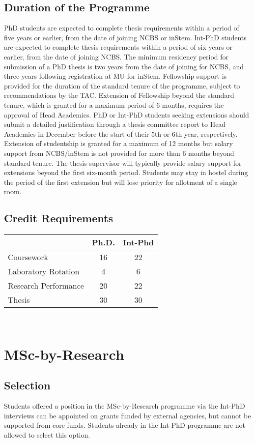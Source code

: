 \documentclass[a4paper]{extarticle}
\begin{document}
\subsection{Duration of the Programme}
PhD students are expected to complete thesis requirements within a period of
five years or earlier, from the date of joining NCBS or inStem. Int-PhD students
are expected to complete thesis requirements within a period of six years or
earlier, from the date of joining NCBS. The minimum residency period for
submission of a PhD thesis is two years from the date of joining for NCBS, and
three years following registration at MU for inStem. Fellowship support is
provided for the duration of the standard tenure of the programme, subject to
recommendations by the TAC. Extension of Fellowship beyond the standard tenure,
which is granted for a maximum period of 6 months, requires the approval of Head
Academics. PhD or Int-PhD students seeking extensions should submit a detailed
justification through a thesis committee report to Head Academics in December
before the start of their 5th or 6th year, respectively. Extension of
studentship is granted for a maximum of 12 months but salary support from
NCBS/inStem is not provided for more than 6 months beyond standard tenure. The
thesis supervisor will typically provide salary support for extensions beyond
the first six-month period. Students may stay in hostel during the period of the
first extension but will lose priority for allotment of a single room. 

\subsection{ Credit Requirements}

\begin{tabular}{l c c}
         & Ph.D. & Int-Phd \\
    \toprule
    Coursework & 16 & 22 \\
    Laboratory Rotation & 4 & 6 \\
    Research Performance & 20 & 22 \\
    Thesis & 30 & 30  \\
    \bottomrule
\end{tabular}
  
\section{MSc-by-Research}

\subsection{Selection}
Students offered a position in the MSc-by-Research programme via the Int-PhD
interviews can be appointed on grants funded by external agencies, but cannot be supported
from core funds. Students already in the Int-PhD programme are not allowed to select this
option.
\end{document}
